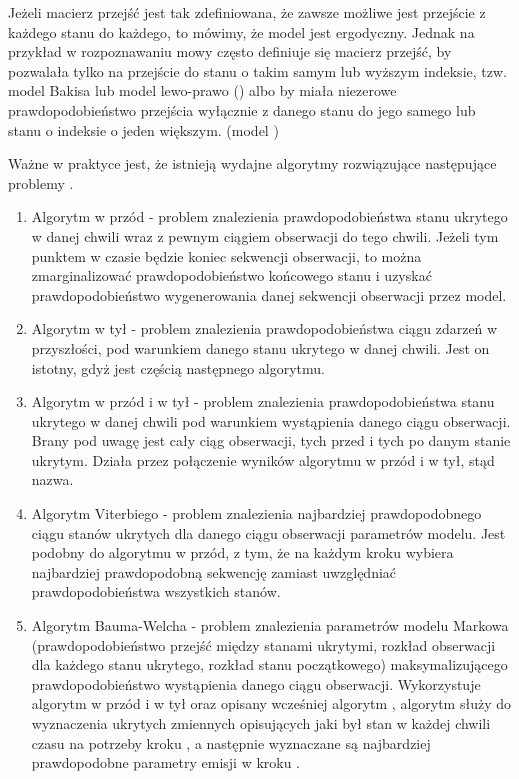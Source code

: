 Jeżeli macierz przejść jest tak zdefiniowana, że zawsze możliwe jest przejście z każdego stanu do każdego, to
mówimy, że model jest ergodyczny. Jednak na przykład w rozpoznawaniu mowy często definiuje się macierz przejść,
by pozwalała tylko na przejście do stanu o takim samym lub wyższym indeksie, tzw. model Bakisa lub model lewo-prawo 
() albo by miała niezerowe prawdopodobieństwo przejścia wyłącznie z danego stanu do jego 
samego lub stanu o indeksie o jeden większym. (model )

Ważne w praktyce jest, że istnieją wydajne algorytmy rozwiązujące następujące problemy .

\begin{enumerate}
    \item Algorytm w przód - problem znalezienia prawdopodobieństwa stanu ukrytego w danej chwili wraz z pewnym ciągiem obserwacji do tego chwili. Jeżeli tym punktem w czasie będzie koniec sekwencji obserwacji, to można zmarginalizować prawdopodobieństwo końcowego stanu i uzyskać prawdopodobieństwo wygenerowania danej sekwencji obserwacji przez model.
    \item Algorytm w tył - problem znalezienia prawdopodobieństwa ciągu zdarzeń w przyszłości, pod warunkiem danego stanu ukrytego w danej chwili. Jest on istotny, gdyż jest częścią następnego algorytmu.
    \item Algorytm w przód i w tył - problem znalezienia prawdopodobieństwa stanu ukrytego w danej chwili pod warunkiem wystąpienia danego ciągu obserwacji. Brany pod uwagę jest cały ciąg obserwacji, tych przed i tych po danym stanie ukrytym. Działa przez połączenie wyników algorytmu w przód i w tył, stąd nazwa. 
    \item Algorytm Viterbiego - problem znalezienia najbardziej prawdopodobnego ciągu stanów ukrytych dla danego ciągu obserwacji parametrów modelu. Jest podobny do algorytmu w przód, z tym, że na każdym kroku wybiera najbardziej prawdopodobną sekwencję zamiast uwzględniać prawdopodobieństwa wszystkich stanów.
    \item Algorytm Bauma-Welcha - problem znalezienia parametrów modelu Markowa (prawdopodobieństwo przejść między stanami ukrytymi, rozkład obserwacji dla każdego stanu ukrytego, rozkład stanu początkowego) maksymalizującego prawdopodobieństwo wystąpienia danego ciągu obserwacji. Wykorzystuje algorytm w przód i w tył oraz opisany wcześniej algorytm , algorytm  służy do wyznaczenia ukrytych zmiennych opisujących jaki był stan w każdej chwili czasu na potrzeby kroku , a następnie wyznaczane są najbardziej prawdopodobne parametry emisji w kroku .
\end{enumerate}

